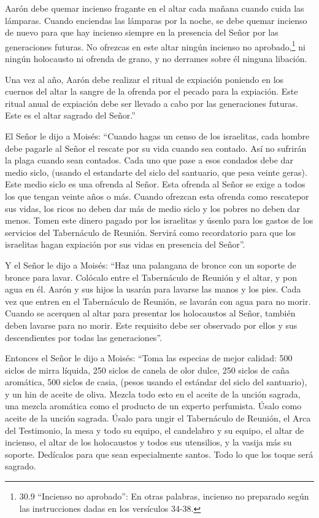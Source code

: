  Aarón debe quemar incienso fragante en el altar cada mañana
cuando cuida las lámparas.  Cuando enciendas las lámparas
por la noche, se debe quemar incienso de nuevo para que hay incienso
siempre en la presencia del Señor por las generaciones futuras.
 No ofrezcas en este altar ningún incienso no
aprobado,\footnote{30.9 ``Incienso no aprobado'': En otras palabras,
  incienso no preparado según las instrucciones dadas en los versículos
  34-38.} ni ningún holocausto ni ofrenda de grano, y no derrames sobre
él ninguna libación.

 Una vez al año, Aarón debe realizar el ritual de expiación
poniendo en los cuernos del altar la sangre de la ofrenda por el pecado
para la expiación. Este ritual anual de expiación debe ser llevado a
cabo por las generaciones futuras. Este es el altar sagrado del Señor.''

 El Señor le dijo a Moisés:  ``Cuando hagas un
censo de los israelitas, cada hombre debe pagarle al Señor el rescate
por su vida cuando sea contado. Así no sufrirán la plaga cuando sean
contados.  Cada uno que pase a esos condados debe dar medio
siclo, (usando el estandarte del siclo del santuario, que pesa veinte
geras). Este medio siclo es una ofrenda al Señor.  Esta
ofrenda al Señor se exige a todos los que tengan veinte años o más.
 Cuando ofrezcan esta ofrenda como rescatepor sus vidas,
los ricos no deben dar más de medio siclo y los pobres no deben dar
menos.  Tomen este dinero pagado por los israelitas y
úsenlo para los gastos de los servicios del Tabernáculo de Reunión.
Servirá como recordatorio para que los israelitas hagan expiación por
sus vidas en presencia del Señor''.

 Y el Señor le dijo a Moisés:  ``Haz una
palangana de bronce con un soporte de bronce para lavar. Colócalo entre
el Tabernáculo de Reunión y el altar, y pon agua en él. 
Aarón y sus hijos la usarán para lavarse las manos y los pies.
 Cada vez que entren en el Tabernáculo de Reunión, se
lavarán con agua para no morir. Cuando se acerquen al altar para
presentar los holocaustos al Señor,  también deben lavarse
para no morir. Este requisito debe ser observado por ellos y sus
descendientes por todas las generaciones''.

 Entonces el Señor le dijo a Moisés:  ``Toma
las especias de mejor calidad: 500 siclos de mirra líquida, 250 siclos
de canela de olor dulce, 250 siclos de caña aromática,  500
siclos de casia, (pesos usando el estándar del siclo del santuario), y
un hin de aceite de oliva.  Mezcla todo esto en el aceite
de la unción sagrada, una mezcla aromática como el producto de un
experto perfumista. Úsalo como aceite de la unción sagrada.
 Úsalo para ungir el Tabernáculo de Reunión, el Arca del
Testimonio,  la mesa y todo su equipo, el candelabro y su
equipo, el altar de incienso,  el altar de los holocaustos
y todos sus utensilios, y la vasija más su soporte. 
Dedícalos para que sean especialmente santos. Todo lo que los toque será
sagrado.

